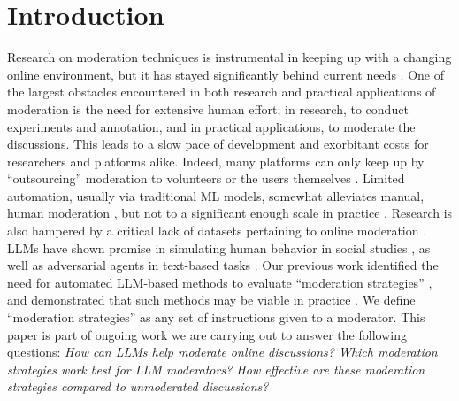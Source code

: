 %

\section{Introduction}
\label{sec:introduction}

Research on moderation techniques is instrumental in keeping up with a changing online environment, but it has stayed significantly behind current needs \cite{seering_self_moderation, make_reddit_great}.
One of the largest obstacles encountered in both research and practical applications of moderation is the need for extensive human effort; in research, to conduct experiments and annotation, and in practical applications, to moderate the discussions. This leads to a slow pace of development and exorbitant costs for researchers and platforms alike. Indeed, many platforms can only keep up by “outsourcing” moderation to volunteers or the users themselves \cite{Matias2019TheCL, schaffner_community_guidelines, seering_self_moderation}. Limited automation, usually via traditional \ac{ML} models, somewhat alleviates manual, human moderation \cite{horta_automated_moderation}, but not to a significant enough scale in practice \cite{schaffner_community_guidelines}. Research is also hampered by a critical lack of datasets pertaining to online moderation \cite{korre2025evaluation}. \acfp{LLM} have shown promise in simulating human behavior in social studies \cite{park2024generativeagentsimulations1000, hewitt2024predicting, Park2023GenerativeAI}, as well as adversarial agents in text-based tasks \cite{cheng2024selfplayingadversariallanguagegame}. Our previous work identified the need for automated \ac{LLM}-based methods to evaluate “moderation strategies” \cite{korre2025evaluation}, and demonstrated that such methods may be viable in practice \cite{dtsirmpas_thesis}. We define “moderation strategies” as any set of instructions given to a moderator. This paper is part of ongoing work we are carrying out to answer the following questions: \textit{How can \acp{LLM} help moderate online discussions? Which moderation strategies work best for \ac{LLM} moderators? How effective are these moderation strategies compared to unmoderated discussions?}

